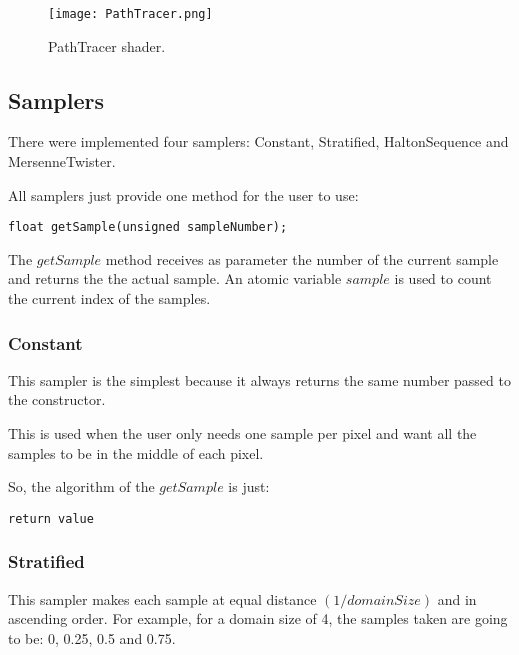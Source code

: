 \begin{figure}[H]
	\centering
	\caption{PathTracer shader.}
	\label{PathTracer shader.}
	\texttt{[image: PathTracer.png]}
\end{figure}


\subsection{Samplers}

\par
There were implemented four samplers: Constant, Stratified, HaltonSequence and MersenneTwister.

\par
All samplers just provide one method for the user to use:

\begin{lstlisting}[caption={Main methods of Sampler}, captionpos=b, label=Sampler]
float getSample(unsigned sampleNumber);
\end{lstlisting}

\par
The
$getSample$
method receives as parameter the number of the current sample and returns the the actual sample.
An atomic variable
$sample$
is used to count the current index of the samples.

\subsubsection{Constant}

\par
This sampler is the simplest because it always returns the same number passed to the constructor.

\par
This is used when the user only needs one sample per pixel and want all the samples to be in the middle of each pixel.

\par
So, the algorithm of the
$getSample$
is just:

\begin{lstlisting}[caption={Algorithm of Constant Sampler}, captionpos=b, label=Constant]
return value
\end{lstlisting}


\subsubsection{Stratified}

\par
This sampler makes each sample at equal distance
$(1 / domainSize)$
and in ascending order.
For example, for a domain size of 4, the samples taken are going to be: 0, 0.25, 0.5 and 0.75.

